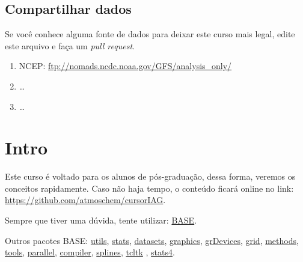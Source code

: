 \documentclass[]{book}
\providecommand{\tightlist}{%
  \setlength{\itemsep}{0pt}\setlength{\parskip}{0pt}}
\begin{document}
\section{Compartilhar dados}\label{compartilhar-dados}

Se você conhece alguma fonte de dados para deixar este curso mais legal,
edite este arquivo e faça um \emph{pull request}.

\begin{enumerate}
\def\labelenumi{\arabic{enumi}.}
\tightlist
\item
  NCEP: \url{ftp://nomads.ncdc.noaa.gov/GFS/analysis_only/}
\item
  \ldots{}
\item
  \ldots{}
\end{enumerate}

\chapter{Intro}\label{intro}

Este curso é voltado para os alunos de pós-graduação, dessa forma,
veremos os conceitos rapidamente. Caso não haja tempo, o conteúdo ficará
online no link: \url{https://github.com/atmoschem/cursorIAG}.

Sempre que tiver uma dúvida, tente utilizar:
\href{http://stat.ethz.ch/R-manual/R-devel/library/base/html/00Index.html}{BASE}.

Outros pacotes BASE:
\href{http://stat.ethz.ch/R-manual/R-devel/library/utils/html/00Index.html}{utils},
\href{http://stat.ethz.ch/R-manual/R-devel/library/stats/html/00Index.html}{stats},
\href{http://stat.ethz.ch/R-manual/R-devel/library/datasets/html/00Index.html}{datasets},
\href{http://stat.ethz.ch/R-manual/R-devel/library/graphics/html/00Index.html}{graphics},
\href{https://stat.ethz.ch/R-manual/R-devel/library/grDevices/html/00Index.html}{grDevices},
\href{https://stat.ethz.ch/R-manual/R-devel/library/grid/html/00Index.html}{grid},
\href{https://stat.ethz.ch/R-manual/R-devel/library/methods/html/00Index.html}{methods},
\href{https://stat.ethz.ch/R-manual/R-devel/library/tools/html/00Index.html}{tools},
\href{https://stat.ethz.ch/R-manual/R-devel/library/parallel/html/00Index.html}{parallel},
\href{https://stat.ethz.ch/R-manual/R-devel/library/compiler/html/00Index.html}{compiler},
\href{https://stat.ethz.ch/R-manual/R-devel/library/splines/html/00Index.html}{splines},
\href{https://stat.ethz.ch/R-manual/R-devel/library/tcltk/html/00Index.html}{tcltk}
,
\href{https://stat.ethz.ch/R-manual/R-devel/library/stats4/html/00Index.html}{stats4}.
\end{document}
